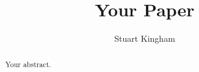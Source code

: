 \documentclass{article}
\title{Your Paper}
\author{Stuart Kingham}
\begin{document}
\maketitle

\begin{abstract}
Your abstract.
\end{abstract}

\tableofcontents









%
%
\printbibliography

\appendix


\end{document}

